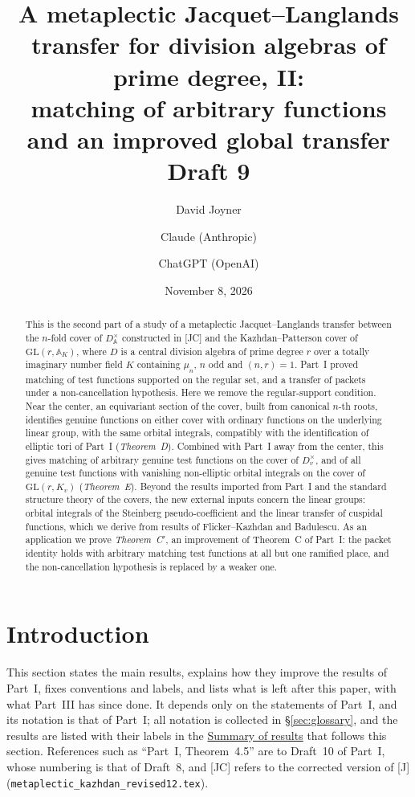 \documentclass[12pt]{article}
\title{A metaplectic Jacquet--Langlands transfer for division algebras of prime degree, II:\\ matching of arbitrary functions and an improved global transfer\\[0.4em]\normalsize Draft 9}
\author{David Joyner \and Claude (Anthropic) \and ChatGPT (OpenAI)}
\date{November 8, 2026}
\newcommand{\A}{\mathbb{A}}
\newcommand{\GL}{\mathrm{GL}}
\theoremstyle{plain}
\theoremstyle{definition}
\begin{document}
\maketitle

\begin{abstract}
This is the second part of a study of a metaplectic Jacquet--Langlands transfer between the $n$-fold cover of $D^\times_{\A}$ constructed in [JC] and the Kazhdan--Patterson cover of $\GL(r,\A_K)$, where $D$ is a central division algebra of prime degree $r$ over a totally imaginary number field $K$ containing $\mu_n$, $n$ odd and $(n,r)=1$. Part~I proved matching of test functions supported on the regular set, and a transfer of packets under a non-cancellation hypothesis. Here we remove the regular-support condition. Near the center, an equivariant section of the cover, built from canonical $n$-th roots, identifies genuine functions on either cover with ordinary functions on the underlying linear group, with the same orbital integrals, compatibly with the identification of elliptic tori of Part~I (\emph{Theorem~D}). Combined with Part~I away from the center, this gives matching of arbitrary genuine test functions on the cover of $D_v^\times$, and of all genuine test functions with vanishing non-elliptic orbital integrals on the cover of $\GL(r,K_v)$ (\emph{Theorem~E}). Beyond the results imported from Part~I and the standard structure theory of the covers, the new external inputs concern the linear groups: orbital integrals of the Steinberg pseudo-coefficient and the linear transfer of cuspidal functions, which we derive from results of Flicker--Kazhdan and Badulescu. As an application we prove \emph{Theorem~C$'$}, an improvement of Theorem~C of Part~I: the packet identity holds with arbitrary matching test functions at all but one ramified place, and the non-cancellation hypothesis is replaced by a weaker one.
\end{abstract}

\tableofcontents

\section{Introduction}\label{sec:intro}
This section states the main results, explains how they improve the results of Part~I, fixes conventions and labels, and lists what is left after this paper, with what Part~III has since done. It depends only on the statements of Part~I, and its notation is that of Part~I; all notation is collected in \S\ref{sec:glossary}, and the results are listed with their labels in the \hyperref[sec:summary]{Summary of results} that follows this section. References such as ``Part~I, Theorem~4.5'' are to Draft~10 of Part~I, whose numbering is that of Draft~8, and [JC] refers to the corrected version of [J] (\texttt{metaplectic\_kazhdan\_revised12.tex}).
\end{document}
